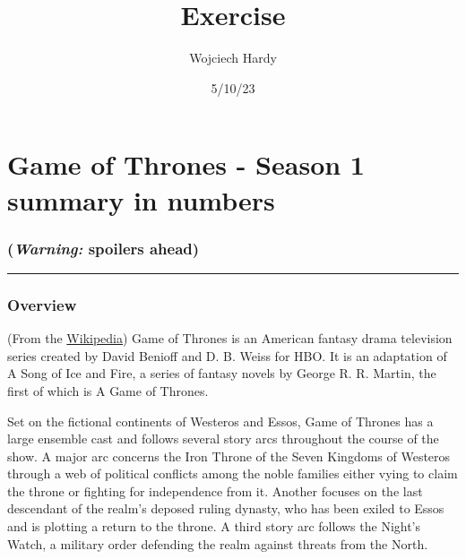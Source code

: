 \documentclass[
  letterpaper,
  DIV=11,
  numbers=noendperiod]{scrartcl}
\title{Exercise}
\author{Wojciech Hardy}
\date{5/10/23}
\begin{document}
\maketitle
\ifdefined\Shaded\renewenvironment{Shaded}{\begin{tcolorbox}[borderline west={3pt}{0pt}{shadecolor}, breakable, frame hidden, enhanced, interior hidden, boxrule=0pt, sharp corners]}{\end{tcolorbox}}\fi

\hypertarget{game-of-thrones---season-1-summary-in-numbers}{%
\section{Game of Thrones - Season 1 summary in
numbers}\label{game-of-thrones---season-1-summary-in-numbers}}

\hypertarget{warning-spoilers-ahead}{%
\subsubsection{\texorpdfstring{\textbf{(\emph{Warning:} spoilers
ahead)}}{(Warning: spoilers ahead)}}\label{warning-spoilers-ahead}}

\begin{center}\rule{0.5\linewidth}{0.5pt}\end{center}

\hypertarget{overview}{%
\subsubsection{Overview}\label{overview}}

(From the
\href{https://en.wikipedia.org/wiki/Game_of_Thrones\#Premise}{Wikipedia})
Game of Thrones is an American fantasy drama television series created
by David Benioff and D. B. Weiss for HBO. It is an adaptation of A Song
of Ice and Fire, a series of fantasy novels by George R. R. Martin, the
first of which is A Game of Thrones.

Set on the fictional continents of Westeros and Essos, Game of Thrones
has a large ensemble cast and follows several story arcs throughout the
course of the show. A major arc concerns the Iron Throne of the Seven
Kingdoms of Westeros through a web of political conflicts among the
noble families either vying to claim the throne or fighting for
independence from it. Another focuses on the last descendant of the
realm's deposed ruling dynasty, who has been exiled to Essos and is
plotting a return to the throne. A third story arc follows the Night's
Watch, a military order defending the realm against threats from the
North.
\end{document}
